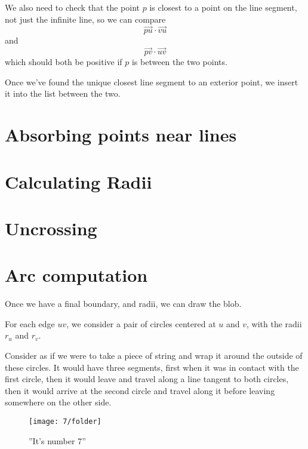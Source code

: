 \documentclass[paper=a4, fontsize=11pt]{scrartcl} %
\numberwithin{equation}{section} %
\numberwithin{figure}{section} %
\numberwithin{table}{section} %
\begin{document}
We also need to check that the point $p$ is closest to a point on the line
segment, not just the infinite line, so we can compare
\[ \vec{pu} \cdot \vec{vu} \]
and
\[ \vec{pv} \cdot \vec{uv} \]
which should both be positive if $p$ is between the two points.


Once we've found the unique closest line segment to an exterior point,
we insert it into the list between the two.

\section{Absorbing points near lines}

\section{Calculating Radii}

\section{Uncrossing}

\section{Arc computation}
Once we have a final boundary, and radii, we can draw the blob.

For each edge $uv$, we consider a pair of circles centered at
$u$ and $v$, with the radii $r_u$ and $r_v$.

Consider as if we were to take a piece of string and wrap it around
the outside of these circles.
It would have three segments,
first when it was in contact with the first circle,
then it would leave and travel along a line tangent to both circles,
then it would arrive at the second circle
and travel along it before leaving somewhere on the other side.




\begin{figure}[h]
\texttt{[image: 7/folder]}
\caption{''It's number 7''}
\end{figure}
\end{document}
